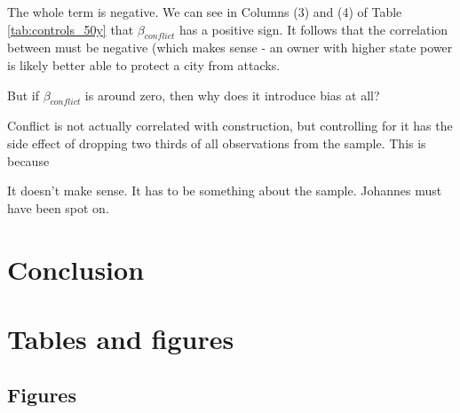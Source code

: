 \documentclass[11pt, a4paper]{article}
\begin{document}
The whole term is negative. We can see in Columns (3) and (4) of Table \ref{tab:controls_50y} that $\beta_{conflict}$ has a positive sign. It follows that the correlation between must be negative (which makes sense - an owner with higher state power is likely better able to protect a city from attacks.

But if $\beta_{conflict}$ is around zero, then why does it introduce bias at all?

Conflict is not actually correlated with construction, but controlling for it has the side effect of dropping two thirds of all observations from the sample. This is because 





It doesn't make sense. It has to be something about the sample. Johannes must have been spot on.




\section{Conclusion} \label{sec:conclusion}

\newpage
\onehalfspacing



\newpage
\section*{Tables and figures}



\subsection*{Figures}
\end{document}

